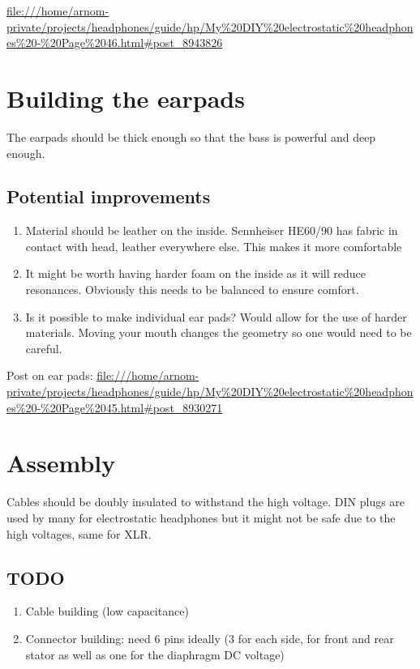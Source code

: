 \documentclass{article}
\begin{document}
\url{file:///home/arnom-private/projects/headphones/guide/hp/My\%20DIY\%20electrostatic\%20headphones\%20-\%20Page\%2046.html#post_8943826}

\section{Building the earpads}
The earpads should be thick enough so that the bass is powerful and deep enough.
\label{s:pads}
\subsection{Potential improvements}
\begin{enumerate}
    \item Material should be leather on the inside. Sennheiser HE60/90 has fabric in contact with head, leather everywhere else. This makes it more comfortable
    \item It might be worth having harder foam on the inside as it will reduce resonances. Obviously this needs to be balanced to ensure comfort.
    \item Is it possible to make individual ear pads? Would allow for the use of harder materials. Moving your mouth changes the geometry so one would need to be careful.
\end{enumerate}
Post on ear pads: \url{file:///home/arnom-private/projects/headphones/guide/hp/My\%20DIY\%20electrostatic\%20headphones\%20-\%20Page\%2045.html#post_8930271}

\section{Assembly}
\label{s:assembly}
Cables should be doubly insulated to withstand the high voltage. DIN plugs are used by many for electrostatic headphones but it might not be safe due to the high voltages, same for XLR.

\subsection{TODO}
\begin{enumerate}
    \item Cable building (low capacitance)
    \item Connector building: need 6 pins ideally (3 for each side, for front and rear stator as well as one for the diaphragm DC voltage)
\end{enumerate}
\end{document}
